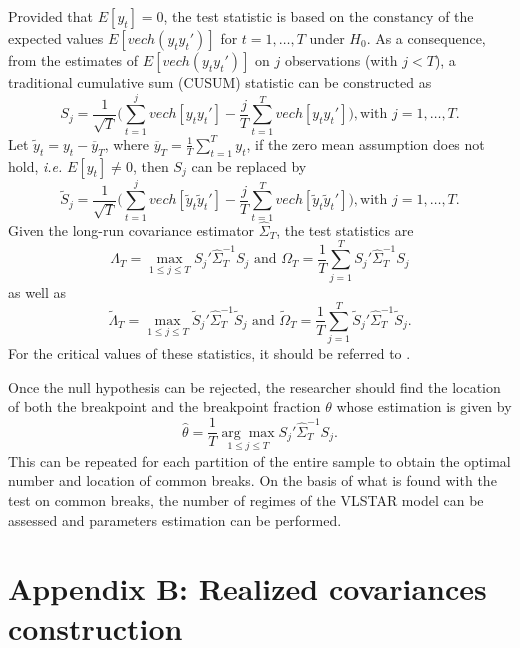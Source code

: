 Provided that $E[y_t] = 0$, the test statistic is based on the constancy of the expected values $E[vech(y_t y_t')]$ for $t = 1, \ldots, T$ under $H_0$. As a consequence, from the estimates of $E[vech(y_t y_t')]$ on $j$ observations (with $j < T$), a traditional cumulative sum (CUSUM) statistic can be constructed as
\begin{equation}
	S_j = \frac{1}{\sqrt{T}}\Bigg(\sum_{t=1}^j vech[y_t y_t']-\frac{j}{T}\sum_{t=1}^{T}vech[y_t y_t']\Bigg), \text{with } j = 1, \ldots, T.
\end{equation}
Let $\tilde{y}_t = y_t - \overline{y}_T$, where $\displaystyle\overline{y}_T = \frac{1}{T}\sum_{t=1}^T y_t$, if the zero mean assumption does not hold, \textit{i.e.} $E[y_t] \neq 0$, then $S_j$ can be replaced by
\begin{equation}
	\tilde{S}_j = \frac{1}{\sqrt{T}}\Bigg(\sum_{t=1}^j vech[\tilde{y}_t \tilde{y}_t']-\frac{j}{T}\sum_{t=1}^{T}vech[\tilde{y}_t \tilde{y}_t']\Bigg), \text{with } j = 1, \ldots, T.
\end{equation}
Given the long-run covariance estimator $\hat{\Sigma}_T$, the test statistics are
\begin{equation}\label{eq:lambda}
	\Lambda_T = \underset{1 \leq j \leq T}{\max} S_j' \hat{\Sigma}_T^{-1}S_j \text{ and } \Omega_T = \frac{1}{T}\sum_{j=1}^T S_j' \hat{\Sigma}_T^{-1}S_j
\end{equation}
as well as
\begin{equation*}
	\tilde{\Lambda}_T = \underset{1 \leq j \leq T}{\max} \tilde{S}_j' \hat{\Sigma}_T^{-1}\tilde{S}_j \text{ and } \tilde{\Omega}_T = \frac{1}{T}\sum_{j=1}^T \tilde{S}_j' \hat{\Sigma}_T^{-1}\tilde{S}_j.
\end{equation*}
For the critical values of these statistics, it should be referred to \citet*{aue2009}.

Once the null hypothesis can be rejected, the researcher should find the location of both the breakpoint and the breakpoint fraction $\theta$ whose estimation is given by
\begin{equation}
	\hat{\theta}= \frac{1}{T} \underset{1 \leq j \leq T}{\arg\max} S_j' \hat{\Sigma}_T^{-1}S_j.
\end{equation}
This can be repeated for each partition of the entire sample to obtain the optimal number and location of common breaks. On the basis of what is found with the test on common breaks, the number of regimes of the VLSTAR model can be assessed and parameters estimation can be performed.

\section{Appendix B: Realized covariances construction} \label{Section32}

